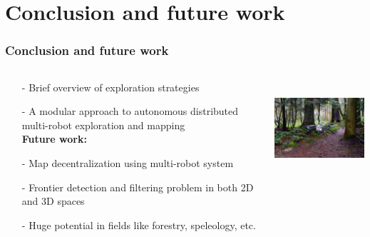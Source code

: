 \section{Conclusion and future work}

\begin{frame}
	\frametitle{Conclusion and future work}
	\begin{columns}
		\begin{column}{0.6\textwidth}\centering
			
			\begin{itemize}
				\item[-] Brief overview of exploration strategies 
				\item[-] A modular approach to autonomous distributed multi-robot exploration and mapping\\
				\textbf{Future work:}  
				\item[-] Map decentralization using multi-robot system
				\item[-] Frontier detection and filtering problem in both 2D and 3D spaces 
				\item[-] Huge potential in fields like forestry, speleology, etc.
				\end{itemize} 
		\end{column}
	\begin{column}{0.5\textwidth}\centering
		\begin{center}
			\includegraphics[height=3.5cm]{figures/forest-uav}
			\label{fig:forest_uav}
		\end{center}
	\end{column}
\end{columns}
\end{frame}
